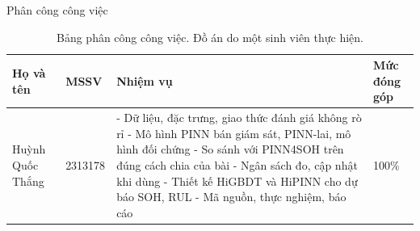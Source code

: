 \begin{preface}{Phân công công việc}
  \begin{table}[h]
    \centering
    \renewcommand{\arraystretch}{1.4}
    \begin{tabular}{|p{3.6cm}|p{2.0cm}|p{6.2cm}|p{2.2cm}|}
      \hline
      \textbf{Họ và tên} & \textbf{MSSV} & \textbf{Nhiệm vụ} & \textbf{Mức đóng góp} \\
      \hline
      Huỳnh Quốc Thắng & 2313178 & - Dữ liệu, đặc trưng, giao thức đánh giá không rò rỉ \newline
        - Mô hình PINN bán giám sát, PINN-lai, mô hình đối chứng \newline
        - So sánh với PINN4SOH trên đúng cách chia của bài \newline
        - Ngân sách đo, cập nhật khi dùng \newline
        - Thiết kế HiGBDT và HiPINN cho dự báo SOH, RUL \newline
        - Mã nguồn, thực nghiệm, báo cáo & 100\% \\
      \hline
    \end{tabular}
    \caption*{Bảng phân công công việc. Đồ án do một sinh viên thực hiện.}
  \end{table}
\end{preface}
